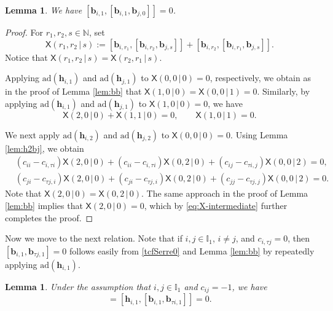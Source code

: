 \documentclass[11pt,reqno]{amsart}
\numberwithin{equation}{section}
\newtheorem{lem}[thm]{Lemma}
\theoremstyle{definition}
\theoremstyle{remark}
\newcommand{\beq}{\begin{equation}}
\newcommand{\eeq}{\end{equation}}
\newcommand{\bb}{\mathbf{b}}
\newcommand{\bh}{\mathbf{h}}
\newcommand{\I}{{\mathbb I}}
\begin{document}
\begin{lem}
We have $[\bb_{i,1},[\bb_{i,1},\bb_{j,0}]]=0$.
\end{lem}

\begin{proof}
For \(r_1,r_2,s\in\mathbb N\), set
\[
 \mathsf X(r_1,r_2\,|\,s)
 :=
 [\bb_{i,r_1},[\bb_{i,r_2},\bb_{j,s}]]
 +
 [\bb_{i,r_2},[\bb_{i,r_1},\bb_{j,s}]].
\]
Notice that $\mathsf X(r_1,r_2\,|\,s)
 =
 \mathsf X(r_2,r_1\,|\,s)$.


Applying $\mathrm{ad}(\bh_{i,1})$ and
$\mathrm{ad}(\bh_{j,1})$ to $\mathsf X(0,0\,|\,0)=0$,
respectively, we obtain as in the proof of Lemma \ref{lem:bb} that
$\mathsf X(1,0\,|\,0)
 =
 \mathsf X(0,0\,|\,1)
 =
 0$. Similarly, by applying $\mathrm{ad}(\bh_{i,1})$ and
$\mathrm{ad}(\bh_{j,1})$ to
\(\mathsf X(1,0\,|\,0)=0\), we have
\beq\label{eq:X-intermediate}
 \mathsf X(2,0\,|\,0)+\mathsf X(1,1\,|\,0)=0,
 \qquad
 \mathsf X(1,0\,|\,1)=0. 
\eeq

We next apply $\mathrm{ad}(\bh_{i,2})$ and
$\mathrm{ad}(\bh_{j,2})$ to
\(\mathsf X(0,0\,|\,0)=0\). Using Lemma \ref{lem:h2bj}, we obtain
\begin{align*}
 &(c_{ii}-c_{i,\tau i})\mathsf X(2,0\,|\,0)
 +(c_{ii}-c_{i,\tau i})\mathsf X(0,2\,|\,0)
 +(c_{ij}-c_{\tau i,j})\mathsf X(0,0\,|\,2)
 =0,
 \\
 &(c_{ji}-c_{\tau j,i})\mathsf X(2,0\,|\,0)
 +(c_{ji}-c_{\tau j,i})\mathsf X(0,2\,|\,0)
 +(c_{jj}-c_{\tau j,j})\mathsf X(0,0\,|\,2)
 =0.
\end{align*}
Note that $\mathsf X(2,0\,|\,0)=\mathsf X(0,2\,|\,0)$. The same approach in the proof of Lemma \ref{lem:bb} implies that $\mathsf X(2,0\,|\,0)=0$, which by \eqref{eq:X-intermediate} further completes the proof.
\end{proof}

Now we move to the next relation. Note that if $i,j\in \I_1$, $i\ne j$, and $c_{i,\tau j}=0$, then $[\bb_{i,1},\bb_{\tau j,1}]=0$ follows easily from \eqref{tcfSerre0} and Lemma \ref{lem:bb} by repeatedly applying $\mathrm{ad}(\bh_{i,1})$.
\begin{lem}\label{lem:hi1hi2-com}
Under the assumption that $i,j\in \I_1$ and $c_{ij}=-1$, we have
\begin{equation*}
 [\mathbf h_{i,1},\mathbf h_{i,2}]
 =
 [\mathbf h_{i,1},
   [\mathbf b_{i,1},\mathbf b_{\tau i,1}]]
 =0.
\end{equation*}
\end{lem}
\end{document}

